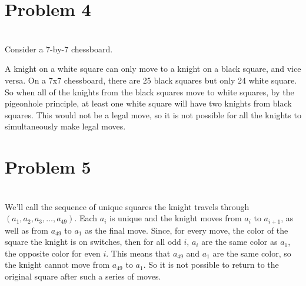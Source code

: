 \documentclass[12pt]{article}
\begin{document}
\newpage
\section*{Problem 4}
\\

Consider a 7-by-7 chessboard.
\begin{center}
\end{center}

A knight on a white square can only move to a knight on a black square, and vice versa. On a 7x7 chessboard, there are 25 black squares but only 24 white square. So when all of the knights from the black squares move to white squares, by the pigeonhole principle, at least one white square will have two knights from black squares. This would not be a legal move, so it is not possible for all the knights to simultaneously make legal moves.

\section*{Problem 5}
\\

We'll call the sequence of unique squares the knight travels through $(a_1, a_2, a_3, \dots, a_{49})$. Each $a_i$ is unique and the knight moves from $a_i$ to $a_{i+1}$, as well as from $a_{49}$ to $a_1$ as the final move. Since, for every move, the color of the square the knight is on switches, then for all odd $i$, $a_i$ are the same color as $a_1$, the opposite color for even $i$. This means that $a_{49}$ and $a_1$ are the same color, so the knight cannot move from $a_{49}$ to $a_1$. So it is not possible to return to the original square after such a series of moves.
\end{document}
